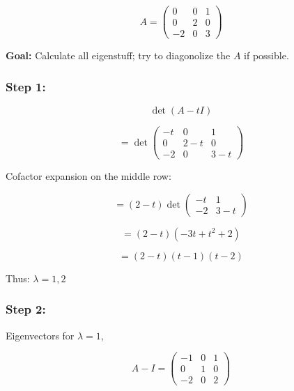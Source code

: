 \documentclass{article}
\newtheorem{one minute paper}[theorem]{One Minute Paper}
\begin{document}
\begin{equation}
    A = \begin{pmatrix}
        0 & 0 & 1\\
        0 & 2 & 0 \\
        -2 & 0 & 3
    \end{pmatrix}
\end{equation}

\textbf{Goal:} Calculate all eigenstuff; try to diagonolize the $A$ if possible.

\subsubsection*{Step 1:}

\begin{equation}
    \det(A - tI)
\end{equation}

\begin{equation}
    = \det\begin{pmatrix}
        -t & 0 & 1 \\
        0 & 2-t & 0 \\
        -2 & 0 & 3-t
    \end{pmatrix}
\end{equation}

Cofactor expansion on the middle row:

\begin{equation}
    = (2-t)\det\begin{pmatrix}
        -t & 1 \\
        -2 & 3-t
    \end{pmatrix}
\end{equation}

\begin{equation}
    = (2-t)(-3t + t^2 + 2)
\end{equation}

\begin{equation}
    = (2-t)(t-1)(t-2)
\end{equation}

Thus: $\lambda = 1,2$

\subsubsection*{Step 2:}

Eigenvectors for $\lambda = 1$,

\begin{equation}
    A - I = \begin{pmatrix}
        -1 & 0 & 1 \\
        0 & 1 & 0 \\
        -2 & 0 & 2
    \end{pmatrix}
\end{equation}
\end{document}
